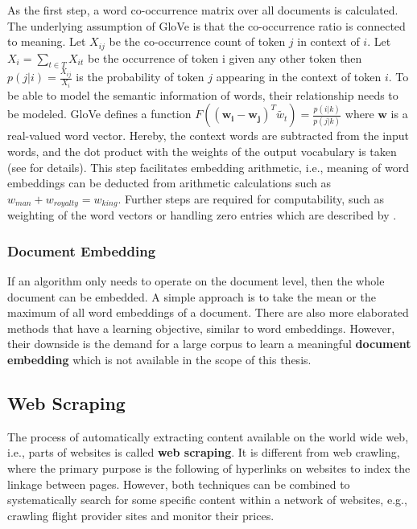   As the first step, a word co-occurrence matrix over all documents is calculated.
  The underlying assumption of GloVe is that the co-occurrence ratio is connected to meaning.
  Let $X_{ij}$ be the co-occurrence count of token $j$ in context of $i$. Let $X_i = \sum_{t \in T} X_{it}$ be the occurrence of token i given any other token then $p(j|i) = \frac{X_{ij}}{X_i}$ is the probability of token $j$ appearing in the context of token $i$.
  To be able to model the semantic information of words, their relationship needs to be modeled.
  GloVe defines a function $F((\mathbf{w_i} - \mathbf{w_j})^T \widetilde{w_t}) = \frac{p(i|k)}{p(j|k)}$ where $\mathbf{w}$ is a real-valued word vector.
  Hereby, the context words are subtracted from the input words, and the dot product with the weights of the output vocabulary is taken (see \cite{Pennington2014} for details).
  This step facilitates embedding arithmetic, i.e., meaning of word embeddings can be deducted from arithmetic calculations such as $w_{man} + w_{royalty} = w_{king}$.
  Further steps are required for computability, such as weighting of the word vectors or handling zero entries which are described by \cite{Pennington2014}.


\subsubsection{Document Embedding}
  If an algorithm only needs to operate on the document level, then the whole document can be embedded.
  A simple approach is to take the mean or the maximum of all word embeddings of a document.
  There are also more elaborated methods \citep{Wu2018, Liu2018, Andrew2015} that have a learning objective, similar to word embeddings.
  However, their downside is the demand for a large corpus to learn a meaningful \textbf{document embedding} which is not available in the scope of this thesis.

\subsection{Web Scraping}
  The process of automatically extracting content available on the world wide web, i.e., parts of websites is called \textbf{web scraping}.
  It is different from web crawling, where the primary purpose is the following of hyperlinks on websites to index the linkage between pages.
  However, both techniques can be combined to systematically search for some specific content within a network of websites, e.g., crawling flight provider sites and monitor their prices.


